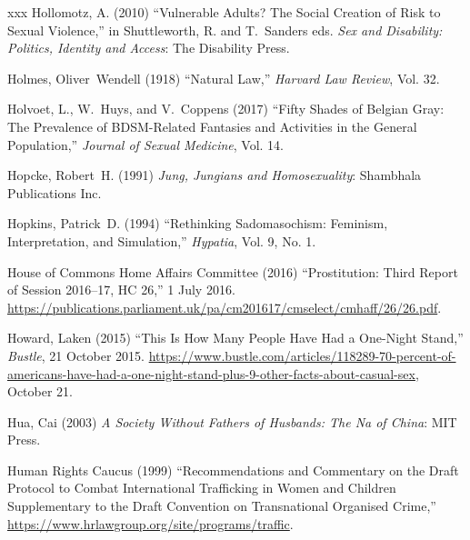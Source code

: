\documentclass[]{jlreq} \usepackage{mystyle}
\begin{document}
\begin{thebibliography}{xxx}
Hollomotz, A. (2010) ``Vulnerable Adults? The Social Creation of Risk to Sexual
  Violence,'' in Shuttleworth, R. and T.~Sanders eds.   \textit{ Sex and
  Disability: Politics, Identity and Access}: The Disability Press.

Holmes, Oliver~Wendell (1918) ``Natural Law,'' \textit{ Harvard Law Review},
  Vol. 32.

Holvoet, L., W.~Huys, and V.~Coppens (2017) ``Fifty Shades of Belgian Gray: The
  Prevalence of BDSM-Related Fantasies and Activities in the General
  Population,'' \textit{ Journal of Sexual Medicine}, Vol. 14.

Hopcke, Robert~H. (1991)  \textit{ Jung, Jungians and Homosexuality}: Shambhala
  Publications Inc.

Hopkins, Patrick~D. (1994) ``Rethinking Sadomasochism: Feminism,
  Interpretation, and Simulation,'' \textit{ Hypatia}, Vol. 9, No. 1.

{House of Commons Home Affairs Committee} (2016) ``Prostitution: Third Report
  of Session 2016--17, HC 26,'' 1 July 2016.
  \url{https://publications.parliament.uk/pa/cm201617/cmselect/cmhaff/26/26.pdf}.

Howard, Laken (2015) ``This Is How Many People Have Had a One-Night Stand,''
  \emph{Bustle}, 21 October 2015.
  \url{https://www.bustle.com/articles/118289-70-percent-of-americans-have-had-a-one-night-stand-plus-9-other-facts-about-casual-sex},
  October 21.

Hua, Cai (2003)  \textit{ A Society Without Fathers of Husbands: The Na of
  China}: MIT Press.

{Human Rights Caucus} (1999) ``Recommendations and Commentary on the Draft
  Protocol to Combat International Trafficking in Women and Children
  Supplementary to the Draft Convention on Transnational Organised Crime,''
  \url{https://www.hrlawgroup.org/site/programs/traffic}.


\end{thebibliography}
\end{document}
